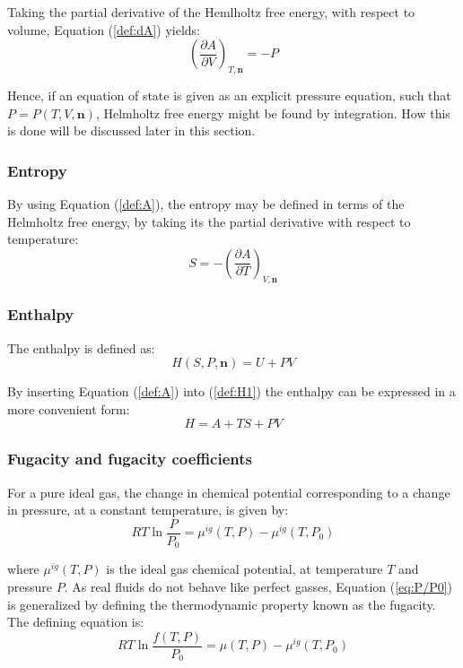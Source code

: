 \documentclass[english]{../thermomemo/thermomemo}
\numberwithin{equation}{section}
\newcommand*{\pder}[2]{\left(\frac{\partial #1}{\partial #2}\right)}
\newcommand*{\reff}[1]{(\ref{#1})}
\begin{document}
Taking the partial derivative of the Hemlholtz free energy, with respect to volume, Equation \reff{def:dA} yields:
\begin{equation}
\label{def:-P}
\pder{A}{V}_{T,\textbf{n}} = -P
\end{equation}

Hence, if an equation of state is given as an explicit pressure equation, such that $P = P(T,V,\textbf{n})$, Helmholtz free energy might be found by integration. How this is done will be discussed later in this section.

\subsubsection*{Entropy}
By using Equation \reff{def:A}, the entropy may be defined in terms of the Helmholtz free energy, by taking its the partial derivative with respect to temperature:
\begin{equation}
\label{def:S}
S = - \pder{A}{T}_{V,\textbf{n}}
\end{equation}

\subsubsection*{Enthalpy}
The enthalpy is defined as:
\begin{equation}
\label{def:H1}
H(S,P,\textbf{n}) = U + PV
\end{equation}

By inserting Equation \reff{def:A} into \reff{def:H1} the enthalpy can be expressed in a more convenient form:
\begin{equation}
\label{def:H2}
H = A + TS + PV
\end{equation}

\subsubsection*{Fugacity and fugacity coefficients}
For a pure ideal gas, the change in chemical potential corresponding to a change in pressure, at a constant temperature, is given by:
\begin{equation}
\label{eq:P/P0}
RT \ln \frac{P}{P_0} = \mu^{ig} (T,P) - \mu^{ig} (T, P_0)
\end{equation}

where $\mu^{ig} (T,P)$ is the ideal gas chemical potential, at temperature $T$ and pressure $P$. As real fluids do not behave like perfect gasses, Equation \reff{eq:P/P0} is generalized by defining the thermodynamic property known as the fugacity. The defining equation is:
\begin{equation}
\label{eq:fugacity}
RT \ln \frac{f(T,P)}{P_0} = \mu (T,P) - \mu^{ig} (T, P_0)
\end{equation}
\end{document}
